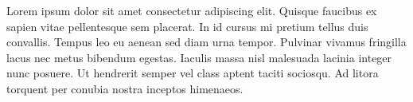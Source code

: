 Lorem ipsum dolor sit amet consectetur adipiscing elit. Quisque
faucibus ex sapien vitae pellentesque sem placerat. In id cursus mi
pretium tellus duis convallis. Tempus leo eu aenean sed diam urna
tempor. Pulvinar vivamus fringilla lacus nec metus bibendum egestas.
Iaculis massa nisl malesuada lacinia integer nunc posuere. Ut
hendrerit semper vel class aptent taciti sociosqu. Ad litora torquent
per conubia nostra inceptos himenaeos.
